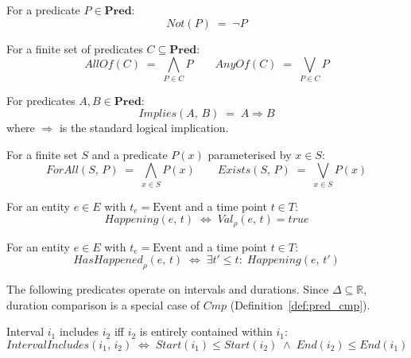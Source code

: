 \begin{definition}[Negation]\label{def:pred_not}
    For a predicate $P \in \mathbf{Pred}$:
    \[
        \mathit{Not}(P) \;=\; \lnot P
    \]
\end{definition}

\begin{definition}\label{def:pred_allandany}
    For a finite set of predicates $C \subseteq \mathbf{Pred}$:
    \[
        \mathit{AllOf}(C) \;=\; \bigwedge_{P \in C} P \qquad
        \mathit{AnyOf}(C) \;=\; \bigvee_{P \in C} P
    \]
\end{definition}

\begin{definition}[Implication]\label{def:pred_implies}
    For predicates $A, B \in \mathbf{Pred}$:
    \[
        \mathit{Implies}(A,\, B) \;=\; A \Rightarrow B
    \]
    where $\Rightarrow$ is the standard logical implication.
\end{definition}

\begin{definition}[Quantifiers]\label{def:pred_quant}
    For a finite set $S$ and a predicate $P(x)$ parameterised by $x \in S$:
    \[
        \mathit{ForAll}(S,\, P) \;=\; \bigwedge_{x \in S} P(x) \qquad
        \mathit{Exists}(S,\, P) \;=\; \bigvee_{x \in S} P(x)
    \]
\end{definition}

\begin{definition}\label{def:pred_happening}
    For an entity $e \in E$ with $t_e = \text{Event}$ and a time point $t \in T$:
    \[
        \mathit{Happening}(e,\, t) \;\Leftrightarrow\; \mathit{Val}_\rho(e,\, t) = \mathit{true}
    \]
\end{definition}

\begin{definition}\label{def:pred_has_happened}
    For an entity $e \in E$ with $t_e = \text{Event}$ and a time point $t \in T$:
    \[
        \mathit{HasHappened}_\rho(e,\, t) \;\Leftrightarrow\; \exists t' \leq t:\; \mathit{Happening}(e,\, t')
    \]
\end{definition}

The following predicates operate on intervals and durations.
Since $\Delta \subseteq \mathbb{R}$, duration comparison is a special case of $\mathit{Cmp}$ (Definition~\ref{def:pred_cmp}).

\begin{definition}\label{def:pred_includes}
    Interval $i_1$ includes $i_2$ iff $i_2$ is entirely contained within $i_1$:
    \[
        \mathit{IntervalIncludes}(i_1,\, i_2) \;\Leftrightarrow\;
        \mathit{Start}(i_1) \leq \mathit{Start}(i_2) \;\land\; \mathit{End}(i_2) \leq \mathit{End}(i_1)
    \]
\end{definition}

